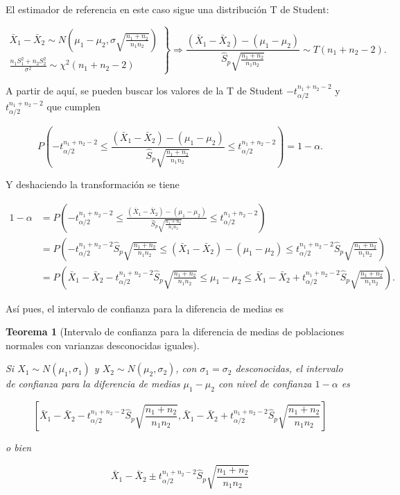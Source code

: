 \documentclass[
  a4paper,
]{scrreport}
\theoremstyle{definition}
\theoremstyle{definition}
\theoremstyle{plain}
\newtheorem{theorem}{Teorema}[chapter]
\theoremstyle{remark}
\begin{document}
El estimador de referencia en este caso sigue una distribución T de
Student:

\[
\left.
\begin{array}{l}
\bar{X}_1-\bar{X}_2\sim N\left(\mu_1-\mu_2,\sigma\sqrt{\frac{n_1+n_2}{n_1n_2}} \right)\\
\displaystyle \frac{n_1S_1^2+n_2S_2^2}{\sigma^2} \sim \chi^2(n_1+n_2-2)
\end{array}
\right\}
\Rightarrow
\frac{(\bar{X}_1-\bar{X}_2)-(\mu_1-\mu_2)}{\hat{S}_p\sqrt{\frac{n_1+n_2}{n_1n_2}}} \sim T(n_1+n_2-2).
\]

A partir de aquí, se pueden buscar los valores de la T de Student
\(-t^{n_1+n_2-2}_{\alpha/2}\) y \(t^{n_1+n_2-2}_{\alpha/2}\) que cumplen

\[
P\left(-t^{n_1+n_2-2}_{\alpha/2}\leq \frac{(\bar{X}_1-\bar{X}_2)-(\mu_1-\mu_2)}{\hat{S}_p\sqrt{\frac{n_1+n_2}{n_1n_2}}}
\leq t^{n_1+n_2-2}_{\alpha/2}\right) = 1-\alpha.
\]

Y deshaciendo la transformación se tiene

\begin{align*}
1-\alpha 
&= P\left(-t^{n_1+n_2-2}_{\alpha/2}\leq \frac{(\bar{X}_1-\bar{X}_2)-(\mu_1-\mu_2)}{\hat{S}_p\sqrt{\frac{n_1+n_2}{n_1n_2}}} \leq t^{n_1+n_2-2}_{\alpha/2}\right) \\
&= P\left(-t^{n_1+n_2-2}_{\alpha/2}\hat{S}_p\sqrt{\frac{n_1+n_2}{n_1n_2}}\leq (\bar{X}_1-\bar{X}_2)-(\mu_1-\mu_2) \leq t^{n_1+n_2-2}_{\alpha/2}\hat{S}_p\sqrt{\frac{n_1+n_2}{n_1n_2}}\right) \\
&= P\left(\bar{X}_1-\bar{X}_2 - t^{n_1+n_2-2}_{\alpha/2}\hat{S}_p\sqrt{\frac{n_1+n_2}{n_1n_2}}\leq \mu_1-\mu_2 \leq \bar{X}_1-\bar{X}_2 + t^{n_1+n_2-2}_{\alpha/2}\hat{S}_p\sqrt{\frac{n_1+n_2}{n_1n_2}}\right).
\end{align*}

Así pues, el intervalo de confianza para la diferencia de medias es

\begin{theorem}[Intervalo de confianza para la diferencia de medias de
poblaciones normales con varianzas desconocidas
iguales]\protect\hypertarget{thm-intervalo-confianza-diferencia-medias-normales-varianzas-desconocidas-iguales}{}\label{thm-intervalo-confianza-diferencia-medias-normales-varianzas-desconocidas-iguales}

Si \(X_1\sim N(\mu_1,\sigma_1)\) y \(X_2\sim N(\mu_2,\sigma_2)\), con
\(\sigma_1 = \sigma_2\) desconocidas, el \emph{intervalo de confianza
para la diferencia de medias} \(\mu_1-\mu_2\) con nivel de confianza
\(1-\alpha\) es

\[
\left[\bar{X}_1-\bar{X}_2-t^{n_1+n_2-2}_{\alpha/2}\hat{S}_p\sqrt{\frac{n_1+n_2}{n_1n_2}},\bar{X}_1-\bar{X}_2+t^{n_1+n_2-2}_{\alpha/2}\hat{S}_p\sqrt{\frac{n_1+n_2}{n_1n_2}}\right]
\]

o bien

\[
\bar{X}_1-\bar{X}_2\pm t^{n_1+n_2-2}_{\alpha/2}\hat{S}_p\sqrt{\frac{n_1+n_2}{n_1n_2}}
\]

\end{theorem}
\end{document}
